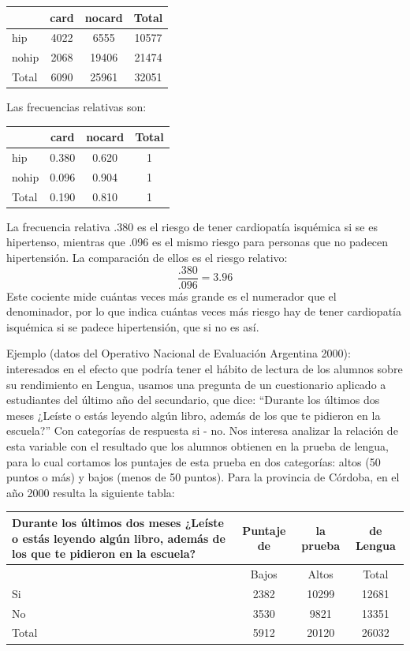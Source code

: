 \documentclass[]{book}
\begin{document}
\begin{longtable}[]{@{}lccc@{}}
\toprule
& card & nocard & Total\tabularnewline
\midrule
\endhead
hip & 4022 & 6555 & 10577\tabularnewline
nohip & 2068 & 19406 & 21474\tabularnewline
Total & 6090 & 25961 & 32051\tabularnewline
\bottomrule
\end{longtable}

Las frecuencias relativas son:

\begin{longtable}[]{@{}lccc@{}}
\toprule
& card & nocard & Total\tabularnewline
\midrule
\endhead
hip & 0.380 & 0.620 & 1\tabularnewline
nohip & 0.096 & 0.904 & 1\tabularnewline
Total & 0.190 & 0.810 & 1\tabularnewline
\bottomrule
\end{longtable}

La frecuencia relativa .380 es el riesgo de tener cardiopatía isquémica si se es hipertenso, mientras que .096 es el mismo riesgo para personas que no padecen hipertensión. La comparación de ellos es el riesgo relativo:
\[\frac{.380}{.096}=3.96\]
Este cociente mide cuántas veces más grande es el numerador que el denominador, por lo que indica cuántas veces más riesgo hay de tener cardiopatía isquémica si se padece hipertensión, que si no es así.

Ejemplo (datos del Operativo Nacional de Evaluación Argentina 2000): interesados en el efecto que podría tener el hábito de lectura de los alumnos sobre su rendimiento en Lengua, usamos una pregunta de un cuestionario aplicado a estudiantes del último año del secundario, que dice: ``Durante los últimos dos meses ¿Leíste o estás leyendo algún libro, además de los que te pidieron en la escuela?'' Con categorías de respuesta si - no. Nos interesa analizar la relación de esta variable con el resultado que los alumnos obtienen en la prueba de lengua, para lo cual cortamos los puntajes de esta prueba en dos categorías: altos (50 puntos o más) y bajos (menos de 50 puntos). Para la provincia de Córdoba, en el año 2000 resulta la siguiente tabla:

\begin{longtable}[]{@{}lccc@{}}
\toprule
Durante los últimos dos meses ¿Leíste o estás leyendo algún libro, además de los que te pidieron en la escuela? & Puntaje de & la prueba & de Lengua\tabularnewline
\midrule
\endhead
& Bajos & Altos & Total\tabularnewline
Si & 2382 & 10299 & 12681\tabularnewline
No & 3530 & 9821 & 13351\tabularnewline
Total & 5912 & 20120 & 26032\tabularnewline
\bottomrule
\end{longtable}
\end{document}
